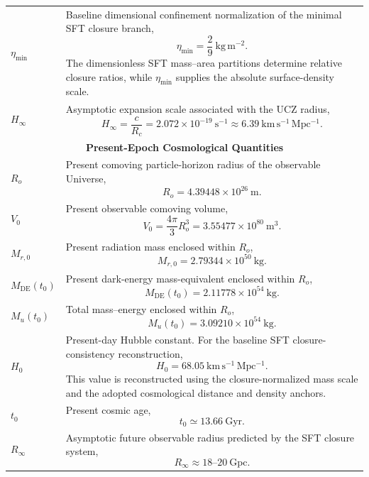 \documentclass[12pt]{article}
\begin{document}
\begin{longtable}{p{}p{}}
$\eta_{\min}$ & Baseline dimensional confinement normalization of the
minimal SFT closure branch,
\[
\eta_{\min}
=
\frac{2}{9}~\mathrm{kg\,m^{-2}}.
\]
The dimensionless SFT mass--area partitions determine relative closure
ratios, while $\eta_{\min}$ supplies the absolute surface-density scale.\\

$H_\infty$ & Asymptotic expansion scale associated with the UCZ radius,
\[
H_\infty=\frac{c}{R_c}
=
2.072\times10^{-19}~\mathrm{s^{-1}}
\approx6.39~\mathrm{km\,s^{-1}\,Mpc^{-1}}.
\]\\


\multicolumn{2}{c}{\textbf{Present-Epoch Cosmological Quantities}}\\
\hline

$R_o$ & Present comoving particle-horizon radius of the observable Universe,
\[
R_o
=
4.39448\times10^{26}~\mathrm{m}.
\]\\

$V_0$ & Present observable comoving volume,
\[
V_0=\frac{4\pi}{3}R_o^3
=
3.55477\times10^{80}~\mathrm{m^3}.
\]\\

$M_{r,0}$ & Present radiation mass enclosed within $R_o$,
\[
M_{r,0}
=
2.79344\times10^{50}~\mathrm{kg}.
\]\\

$M_{\mathrm{DE}}(t_0)$ & Present dark-energy mass-equivalent enclosed within $R_o$,
\[
M_{\mathrm{DE}}(t_0)
=
2.11778\times10^{54}~\mathrm{kg}.
\]\\

$M_u(t_0)$ & Total mass--energy enclosed within $R_o$,
\[
M_u(t_0)
=
3.09210\times10^{54}~\mathrm{kg}.
\]\\

$H_0$ & Present-day Hubble constant. For the baseline SFT
closure-consistency reconstruction,
\[
H_0
=
68.05~\mathrm{km\,s^{-1}\,Mpc^{-1}}.
\]
This value is reconstructed using the closure-normalized mass scale
and the adopted cosmological distance and density anchors.\\

$t_0$ & Present cosmic age,
\[
t_0\simeq13.66~\mathrm{Gyr}.
\]\\

$R_\infty$ & Asymptotic future observable radius predicted by the SFT closure system,
\[
R_\infty
\approx18\text{--}20~\mathrm{Gpc}.
\]\\


\end{longtable}
\end{document}
